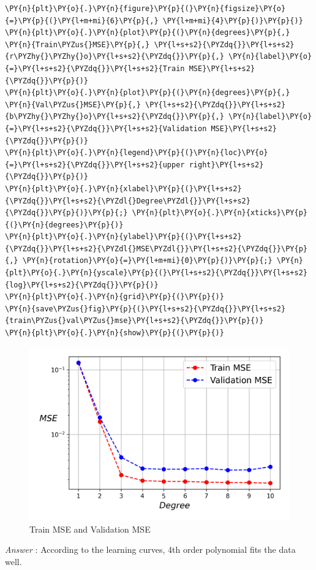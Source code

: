 \documentclass[a4paper,11pt]{article}%
\begin{document}
\begin{tcolorbox}[breakable, size=fbox, boxrule=1pt, pad at break*=1mm,colback=cellbackground, colframe=cellborder]
\begin{Verbatim}[commandchars=\\\{\}]
\PY{n}{plt}\PY{o}{.}\PY{n}{figure}\PY{p}{(}\PY{n}{figsize}\PY{o}{=}\PY{p}{(}\PY{l+m+mi}{6}\PY{p}{,} \PY{l+m+mi}{4}\PY{p}{)}\PY{p}{)}
\PY{n}{plt}\PY{o}{.}\PY{n}{plot}\PY{p}{(}\PY{n}{degrees}\PY{p}{,} \PY{n}{Train\PYZus{}MSE}\PY{p}{,} \PY{l+s+s2}{\PYZdq{}}\PY{l+s+s2}{r\PYZhy{}\PYZhy{}o}\PY{l+s+s2}{\PYZdq{}}\PY{p}{,} \PY{n}{label}\PY{o}{=}\PY{l+s+s2}{\PYZdq{}}\PY{l+s+s2}{Train MSE}\PY{l+s+s2}{\PYZdq{}}\PY{p}{)}
\PY{n}{plt}\PY{o}{.}\PY{n}{plot}\PY{p}{(}\PY{n}{degrees}\PY{p}{,} \PY{n}{Val\PYZus{}MSE}\PY{p}{,} \PY{l+s+s2}{\PYZdq{}}\PY{l+s+s2}{b\PYZhy{}\PYZhy{}o}\PY{l+s+s2}{\PYZdq{}}\PY{p}{,} \PY{n}{label}\PY{o}{=}\PY{l+s+s2}{\PYZdq{}}\PY{l+s+s2}{Validation MSE}\PY{l+s+s2}{\PYZdq{}}\PY{p}{)}
\PY{n}{plt}\PY{o}{.}\PY{n}{legend}\PY{p}{(}\PY{n}{loc}\PY{o}{=}\PY{l+s+s2}{\PYZdq{}}\PY{l+s+s2}{upper right}\PY{l+s+s2}{\PYZdq{}}\PY{p}{)}
\PY{n}{plt}\PY{o}{.}\PY{n}{xlabel}\PY{p}{(}\PY{l+s+s2}{\PYZdq{}}\PY{l+s+s2}{\PYZdl{}Degree\PYZdl{}}\PY{l+s+s2}{\PYZdq{}}\PY{p}{)}\PY{p}{;} \PY{n}{plt}\PY{o}{.}\PY{n}{xticks}\PY{p}{(}\PY{n}{degrees}\PY{p}{)}
\PY{n}{plt}\PY{o}{.}\PY{n}{ylabel}\PY{p}{(}\PY{l+s+s2}{\PYZdq{}}\PY{l+s+s2}{\PYZdl{}MSE\PYZdl{}}\PY{l+s+s2}{\PYZdq{}}\PY{p}{,} \PY{n}{rotation}\PY{o}{=}\PY{l+m+mi}{0}\PY{p}{)}\PY{p}{;} \PY{n}{plt}\PY{o}{.}\PY{n}{yscale}\PY{p}{(}\PY{l+s+s2}{\PYZdq{}}\PY{l+s+s2}{log}\PY{l+s+s2}{\PYZdq{}}\PY{p}{)}
\PY{n}{plt}\PY{o}{.}\PY{n}{grid}\PY{p}{(}\PY{p}{)}
\PY{n}{save\PYZus{}fig}\PY{p}{(}\PY{l+s+s2}{\PYZdq{}}\PY{l+s+s2}{train\PYZus{}val\PYZus{}mse}\PY{l+s+s2}{\PYZdq{}}\PY{p}{)}
\PY{n}{plt}\PY{o}{.}\PY{n}{show}\PY{p}{(}\PY{p}{)}
\end{Verbatim}
\end{tcolorbox}

\begin{figure}[h]
	\centering
	\includegraphics[width=0.7\linewidth]{figures/train_val_mse}
	\caption{Train MSE and Validation MSE}
\end{figure}
   
   \emph{Answer} : According to the learning curves, 4th order polynomial
   fits the data well.
   
\end{document}
